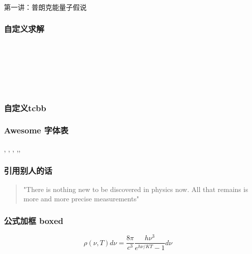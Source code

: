 \begin{frame} [plain]
  \frametitle{}
  \Background[1]
  \begin{center}
  { {\huge 第一讲：普朗克能量子假说 }}
  \end{center}
  \addtocounter{framenumber}{-1}
\end{frame}

\begin{frame}
  \frametitle{自定义求解}
  \解	\\
  \Solution \\

  \Tips \\
  \Note \\
  \证 \\
\end{frame}

\begin{frame}
  \frametitle{自定义tcbb}
\end{frame}

\begin{frame}
  \frametitle{Awesome 字体表}
  \alert{\faHeartbeat, \faStar, \faThumbTack, \faThumbsUp,\faUniversity, \faCircle}
\end{frame}

\begin{frame}
  \frametitle{引用别人的话}
  \begin{quotation}
    "There is nothing new to be discovered in physics now. All that remains is
    more and more precise measurements"   \\
\end{quotation}
\end{frame}

\begin{frame}
  \frametitle{公式加框 boxed}
  \begin{equation}
    \boxed{\rho(\nu, T) d \nu=\frac{8 \pi}{c^{3}} \frac{h \nu^{3}}{e^{h \nu / K T}-1} d \nu}
  \end{equation}

\end{frame}

